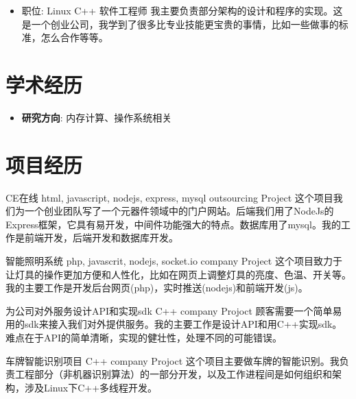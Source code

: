 \documentclass[11pt,a4paper]{moderncv}
\begin{document}
{
\begin{itemize}
\item 职位: Linux C++ 软件工程师
我主要负责部分架构的设计和程序的实现。这是一个创业公司，我学到了很多比专业技能更宝贵的事情，比如一些做事的标准，怎么合作等等。
\end{itemize}
}

\section{学术经历}
{
\begin{itemize}
\item \textbf{研究方向}: 内存计算、操作系统相关
\end{itemize}
}

\section{项目经历}
{CE在线}
{html, javascript, nodejs, express, mysql}
{outsourcing Project}
{}
{
这个项目我们为一个创业团队写了一个元器件领域中的门户网站。后端我们用了NodeJs的Express框架，它具有易开发，中间件功能强大的特点。数据库用了mysql。我的工作是前端开发，后端开发和数据库开发。\\
}

\vspace*{0.2\baselineskip}
{智能照明系统}
{php, javascrit, nodejs, socket.io}
{company Project}
{}
{
这个项目致力于让灯具的操作更加方便和人性化，比如在网页上调整灯具的亮度、色温、开关等。我的主要工作是开发后台网页(php)，实时推送(nodejs)和前端开发(js)。\\
}

\vspace*{0.2\baselineskip}
{为公司对外服务设计API和实现sdk}
{C++}
{company Projoct}
{}
{
顾客需要一个简单易用的sdk来接入我们对外提供服务。我的主要工作是设计API和用C++实现sdk。难点在于API的简单清晰，实现的健壮性，处理不同的可能错误。\\
}

\vspace*{0.2\baselineskip}
{车牌智能识别项目}
{C++}
{company Projoct}
{}
{
这个项目主要做车牌的智能识别。我负责工程部分（非机器识别算法）的一部分开发，以及工作进程间是如何组织和架构，涉及Linux下C++多线程开发。\\
}
\end{document}
